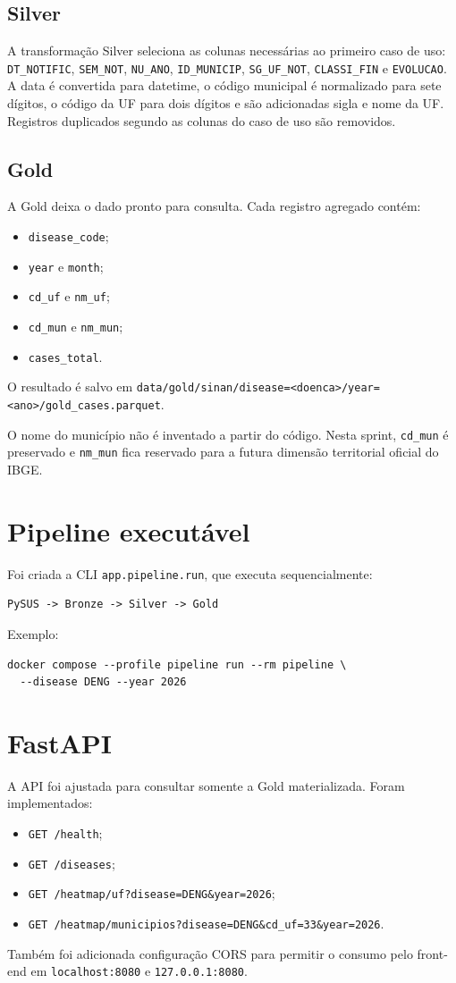 \documentclass[12pt,a4paper]{article}
\begin{document}
\subsection{Silver}
A transformação Silver seleciona as colunas necessárias ao primeiro caso de uso: \texttt{DT\_NOTIFIC}, \texttt{SEM\_NOT}, \texttt{NU\_ANO}, \texttt{ID\_MUNICIP}, \texttt{SG\_UF\_NOT}, \texttt{CLASSI\_FIN} e \texttt{EVOLUCAO}. A data é convertida para datetime, o código municipal é normalizado para sete dígitos, o código da UF para dois dígitos e são adicionadas sigla e nome da UF. Registros duplicados segundo as colunas do caso de uso são removidos.

\subsection{Gold}
A Gold deixa o dado pronto para consulta. Cada registro agregado contém:
\begin{itemize}
\item \texttt{disease\_code};
\item \texttt{year} e \texttt{month};
\item \texttt{cd\_uf} e \texttt{nm\_uf};
\item \texttt{cd\_mun} e \texttt{nm\_mun};
\item \texttt{cases\_total}.
\end{itemize}
O resultado é salvo em \texttt{data/gold/sinan/disease=<doenca>/year=<ano>/gold\_cases.parquet}.

O nome do município não é inventado a partir do código. Nesta sprint, \texttt{cd\_mun} é preservado e \texttt{nm\_mun} fica reservado para a futura dimensão territorial oficial do IBGE.

\section{Pipeline executável}
Foi criada a CLI \texttt{app.pipeline.run}, que executa sequencialmente:
\begin{verbatim}
PySUS -> Bronze -> Silver -> Gold
\end{verbatim}
Exemplo:
\begin{verbatim}
docker compose --profile pipeline run --rm pipeline \
  --disease DENG --year 2026
\end{verbatim}

\section{FastAPI}
A API foi ajustada para consultar somente a Gold materializada. Foram implementados:
\begin{itemize}
\item \texttt{GET /health};
\item \texttt{GET /diseases};
\item \texttt{GET /heatmap/uf?disease=DENG\&year=2026};
\item \texttt{GET /heatmap/municipios?disease=DENG\&cd\_uf=33\&year=2026}.
\end{itemize}
Também foi adicionada configuração CORS para permitir o consumo pelo front-end em \texttt{localhost:8080} e \texttt{127.0.0.1:8080}.
\end{document}
